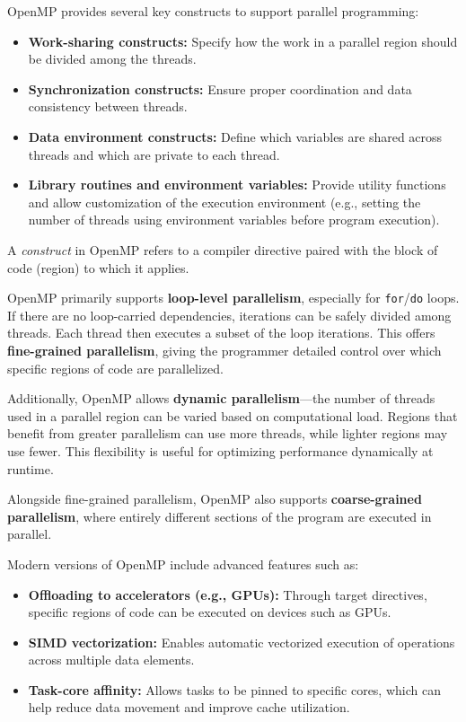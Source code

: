 \documentclass[12pt]{book}
\begin{document}
OpenMP provides several key constructs to support parallel programming:
\begin{itemize}
    \item \textbf{Work-sharing constructs:} Specify how the work in a parallel region should be divided among the threads.
    \item \textbf{Synchronization constructs:} Ensure proper coordination and data consistency between threads.
    \item \textbf{Data environment constructs:} Define which variables are shared across threads and which are private to each thread.
    \item \textbf{Library routines and environment variables:} Provide utility functions and allow customization of the execution environment (e.g., setting the number of threads using environment variables before program execution).
\end{itemize}

A \textit{construct} in OpenMP refers to a compiler directive paired with the block of code (region) to which it applies.

OpenMP primarily supports \textbf{loop-level parallelism}, especially for \texttt{for}/\texttt{do} loops. If there are no loop-carried dependencies, iterations can be safely divided among threads. Each thread then executes a subset of the loop iterations. This offers \textbf{fine-grained parallelism}, giving the programmer detailed control over which specific regions of code are parallelized.

Additionally, OpenMP allows \textbf{dynamic parallelism}—the number of threads used in a parallel region can be varied based on computational load. Regions that benefit from greater parallelism can use more threads, while lighter regions may use fewer. This flexibility is useful for optimizing performance dynamically at runtime.

Alongside fine-grained parallelism, OpenMP also supports \textbf{coarse-grained parallelism}, where entirely different sections of the program are executed in parallel.

Modern versions of OpenMP include advanced features such as:
\begin{itemize}
    \item \textbf{Offloading to accelerators (e.g., GPUs):} Through target directives, specific regions of code can be executed on devices such as GPUs.
    \item \textbf{SIMD vectorization:} Enables automatic vectorized execution of operations across multiple data elements.
    \item \textbf{Task-core affinity:} Allows tasks to be pinned to specific cores, which can help reduce data movement and improve cache utilization.
\end{itemize}
\end{document}
